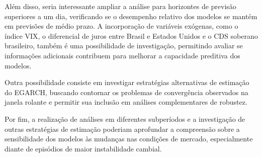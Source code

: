 Além disso, seria interessante ampliar a análise para horizontes de previsão superiores a um dia, verificando se o desempenho 
relativo dos modelos se mantém em previsões de médio prazo. A incorporação de variáveis exógenas, como o índice VIX, o diferencial de 
juros entre Brasil e Estados Unidos e o CDS soberano brasileiro, também é uma possibilidade de investigação, permitindo avaliar se informações 
adicionais contribuem para melhorar a capacidade preditiva dos modelos.

Outra possibilidade consiste em investigar estratégias alternativas de estimação do EGARCH, buscando contornar os problemas de convergência 
observados na janela rolante e permitir sua inclusão em análises complementares de robustez.

Por fim, a realização de análises em diferentes subperíodos e a investigação de outras estratégias de estimação poderiam aprofundar a 
compreensão sobre a sensibilidade dos modelos às mudanças nas condições de mercado, especialmente diante de episódios de maior instabilidade 
cambial.

